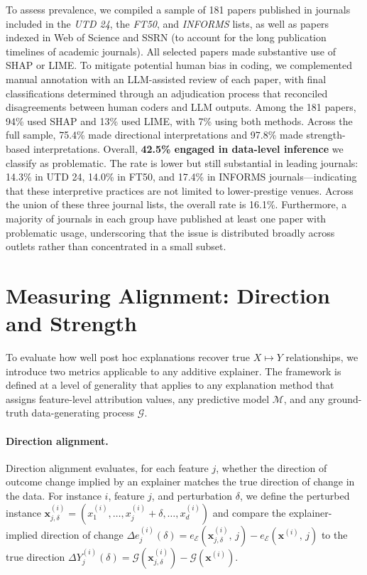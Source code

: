 \documentclass[11pt]{article}
\begin{document}
To assess prevalence, we compiled a sample of 181 papers published in journals included in the \textit{UTD 24}, the \textit{FT50}, and \textit{INFORMS} lists, as well as papers indexed in Web of Science and SSRN (to account for the long publication timelines of academic journals). All selected papers made substantive use of SHAP or LIME. To mitigate potential human bias in coding, we complemented manual annotation with an LLM-assisted review of each paper, with final classifications determined through an adjudication process that reconciled disagreements between human coders and LLM outputs. Among the 181 papers, 94\% used SHAP and 13\% used LIME, with 7\% using both methods.
Across the full sample, 75.4\% made directional interpretations and 97.8\% made strength-based interpretations. Overall, \textbf{42.5\% engaged in data-level inference} we classify as problematic. The rate is lower but still substantial in leading journals: 14.3\% in UTD 24, 14.0\% in FT50, and 17.4\% in INFORMS journals---indicating that these interpretive practices are not limited to lower-prestige venues. Across the union of these three journal lists, the overall rate is 16.1\%. Furthermore, a majority of journals in each group have published at least one paper with problematic usage, underscoring that the issue is distributed broadly across outlets rather than concentrated in a small subset.

\section{Measuring Alignment: Direction and Strength}

To evaluate how well post hoc explanations recover true $X \mapsto Y$ relationships, we introduce two metrics applicable to any additive explainer. The framework is defined at a level of generality that applies to any explanation method that assigns feature-level attribution values, any predictive model $\mathcal{M}$, and any ground-truth data-generating process $\mathcal{G}$.

\paragraph{Direction alignment.}
Direction alignment evaluates, for each feature $j$, whether the direction of outcome change implied by an explainer matches the true direction of change in the data. For instance $i$, feature $j$, and perturbation $\delta$, we define the perturbed instance $\mathbf{x}^{(i)}_{j,\delta} = (x^{(i)}_1, \ldots, x^{(i)}_j + \delta, \ldots, x^{(i)}_d)$ and compare the explainer-implied direction of change $\Delta e^{(i)}_{j}(\delta) = e_{\mathcal{E}}\!\left(\mathbf{x}^{(i)}_{j,\delta},\, j\right) - e_{\mathcal{E}}\!\left(\mathbf{x}^{(i)},\, j\right)$ to the true direction $\Delta Y^{(i)}_{j}(\delta) = \mathcal{G}\!\left(\mathbf{x}^{(i)}_{j,\delta}\right) - \mathcal{G}\!\left(\mathbf{x}^{(i)}\right)$.
\end{document}
